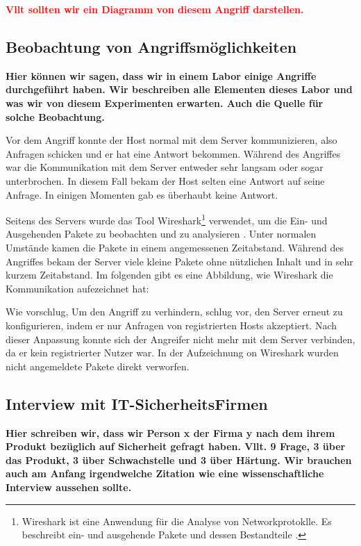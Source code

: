 \textcolor{red}{\textbf{Vllt sollten wir ein Diagramm von diesem Angriff darstellen.}}


\subsection{Beobachtung von Angriffsmöglichkeiten}
\textbf{Hier können wir sagen, dass wir in einem Labor einige Angriffe durchgeführt haben. Wir beschreiben alle Elementen
dieses Labor und was wir von diesem Experimenten erwarten. Auch die Quelle für solche Beobachtung.}

Vor dem Angriff konnte der Host normal mit dem Server kommunizieren, also Anfragen schicken und er hat eine Antwort bekommen.
Während des Angriffes war die Kommunikation mit dem Server entweder sehr langsam oder sogar unterbrochen. In diesem Fall
bekam der Host selten eine Antwort auf seine Anfrage. In einigen Momenten gab es überhaubt keine Antwort. 

Seitens des Servers wurde das Tool Wireshark\footnote{Wireshark ist eine Anwendung für die Analyse von Networkprotoklle.
Es beschreibt ein- und ausgehende Pakete und dessen Bestandteile \cite{refst:wisa}.} verwendet, um die Ein- und Ausgehenden
Pakete zu beobachten und zu analysieren \cite{refart:UBEC}. Unter normalen Umstände kamen die Pakete in einem angemessenen
Zeitabstand. Während des Angriffes bekam der Server viele kleine Pakete ohne nützlichen Inhalt und in sehr kurzem Zeitabstand.
Im folgenden gibt es eine Abbildung, wie Wireshark die Kommunikation aufezeichnet hat:


Wie \cite{refip:NYRS} vorschlug, Um den Angriff zu verhindern, schlug  \cite{refip:NYRS} vor, den Server erneut 
zu konfigurieren, indem er nur Anfragen von registrierten Hosts akzeptiert. Nach dieser Anpassung konnte sich 
der Angreifer nicht mehr mit dem Server verbinden, da er kein registrierter Nutzer war. In der Aufzeichnung 
on Wireshark wurden nicht angemeldete Pakete direkt verworfen.

\subsection{Interview mit IT-SicherheitsFirmen}

\textbf{Hier schreiben wir, dass wir Person x der Firma y nach dem ihrem Produkt bezüglich auf Sicherheit gefragt haben.
Vllt. 9 Frage, 3 über das Produkt, 3 über Schwachstelle und 3 über Härtung. Wir brauchen auch am Anfang irgendwelche Zitation
wie eine wissenschaftliche Interview aussehen sollte.}

